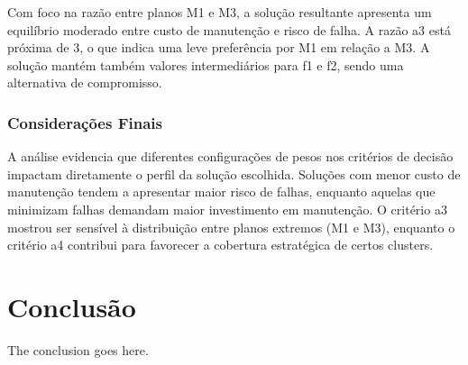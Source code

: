 \documentclass[conference]{IEEEtran}
\begin{document}
Com foco na razão entre planos M1 e M3, a solução resultante apresenta um equilíbrio moderado entre custo de manutenção e risco de falha. A razão a3 está próxima de 3, o que indica uma leve preferência por M1 em relação a M3. A solução mantém também valores intermediários para f1 e f2, sendo uma alternativa de compromisso.

\subsubsection{Considerações Finais}

A análise evidencia que diferentes configurações de pesos nos critérios de decisão impactam diretamente o perfil da solução escolhida. Soluções com menor custo de manutenção tendem a apresentar maior risco de falhas, enquanto aquelas que minimizam falhas demandam maior investimento em manutenção. O critério a3 mostrou ser sensível à distribuição entre planos extremos (M1 e M3), enquanto o critério a4 contribui para favorecer a cobertura estratégica de certos clusters.

\section{Conclusão}
The conclusion goes here.


\end{document}
